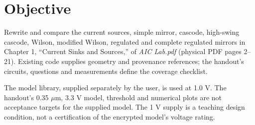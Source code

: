 \section{Objective}
Rewrite and compare the current sources, simple mirror, cascode, high-swing cascode, Wilson, modified Wilson, regulated and complete regulated mirrors in Chapter 1, ``Current Sinks and Sources,'' of \textit{AIC Lab.pdf} (physical PDF pages 2--21). Existing code supplies geometry and provenance references; the handout's circuits, questions and measurements define the coverage checklist.

The model library, supplied separately by the user, is used at 1.0 V. The handout's 0.35 $\mu$m, 3.3 V model, threshold and numerical plots are not acceptance targets for the supplied model. The 1 V supply is a teaching design condition, not a certification of the encrypted model's voltage rating.

